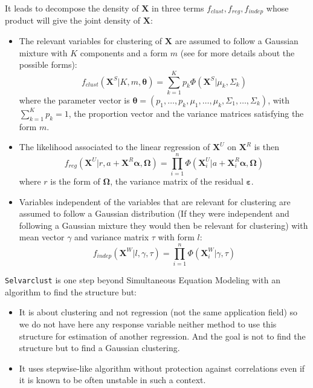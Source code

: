 \documentclass[12pt,a4paper]{report}
\begin{document}
It leads to decompose the density of $\boldsymbol{X}$ in three terms $f_{clust},f_{reg},f_{indep}$ whose product will give the joint density of $\boldsymbol{X}$:
\begin{itemize}
	\item The relevant variables for clustering of $\boldsymbol{X}$ are assumed to follow a Gaussian mixture with $K$ components and a form $m$ (see \cite{biernacki2006model} for more details about the possible forms):
	\begin{equation}
		f_{clust}(\boldsymbol{X}^S|K,m,\boldsymbol{\theta})=\sum_{k=1}^K p_k \Phi (\boldsymbol{X}^S|\mu_k,\Sigma_k) \nonumber 
	\end{equation}
	where the parameter vector is $\boldsymbol{\theta}=(p_1,\dots,p_k,\mu_1,\dots,\mu_k,\Sigma_1,\dots,\Sigma_k)$, with $\sum_{k=1}^K p_k=1$, the proportion vector and the variance matrices satisfying the form $m$.
	\item The likelihood associated to the linear regression of $\boldsymbol{X}^U$ on $\boldsymbol{X}^R$ is then
	\begin{equation}
		f_{reg}(\boldsymbol{X}^U|r,a+\boldsymbol{X}^R\boldsymbol{\alpha},\boldsymbol{\Omega})=\prod_{i=1}^n \Phi(\boldsymbol{X}_i^U|a+\boldsymbol{X}_i^R \boldsymbol{\alpha},\boldsymbol{\Omega}) \nonumber 
	\end{equation}
	where $r$ is the form of $\boldsymbol{\Omega}$, the variance matrix of the residual $\boldsymbol{\varepsilon}$.
	\item Variables independent of the variables that are relevant for clustering are assumed to follow a Gaussian distribution (If they were independent and following a Gaussian mixture they would then be relevant for clustering) with mean vector $\gamma$ and variance matrix $\tau$ with form $l$:
	\begin{equation}
		f_{indep}(\boldsymbol{X}^{W}|l,\gamma,\tau)=\prod_{i=1}^n \Phi (\boldsymbol{X}_i^W|\gamma,\tau) \nonumber 
	\end{equation}
\end{itemize}


{\tt Selvarclust} is one step beyond Simultaneous Equation Modeling with an algorithm to find the structure but:
			\begin{itemize}
				\item It is about clustering and not regression (not the same application field) so we do not have here any response variable neither method to use this structure for estimation of another regression.  And the goal is not to find the structure but to find a Gaussian clustering.
				\item It uses stepwise-like algorithm \cite{raftery2006variable} without protection against correlations even if it is known to be often unstable \cite{miller2002subset} in such a context.
			\end{itemize}
			
\end{document}
